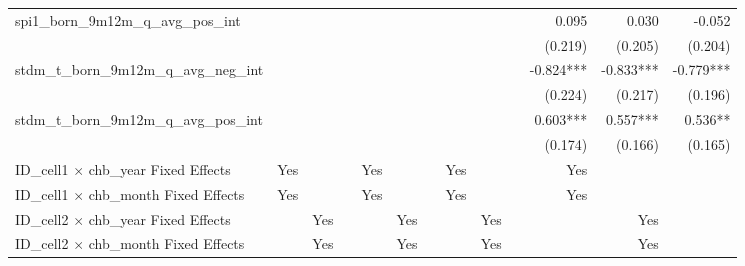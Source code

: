 \begin{tabular}{lrrrrrrrrrrrr}
spi1\_born\_9m12m\_q\_avg\_pos\_int         &              &              &              &              &              &              &              &              &              &        0.095 &        0.030 &       -0.052 \\ 
                                            &              &              &              &              &              &              &              &              &              &      (0.219) &      (0.205) &      (0.204) \\ 
stdm\_t\_born\_9m12m\_q\_avg\_neg\_int      &              &              &              &              &              &              &              &              &              &    -0.824*** &    -0.833*** &    -0.779*** \\ 
                                            &              &              &              &              &              &              &              &              &              &      (0.224) &      (0.217) &      (0.196) \\ 
stdm\_t\_born\_9m12m\_q\_avg\_pos\_int      &              &              &              &              &              &              &              &              &              &     0.603*** &     0.557*** &      0.536** \\ 
                                            &              &              &              &              &              &              &              &              &              &      (0.174) &      (0.166) &      (0.165) \\ 
\midrule
ID\_cell1 $\times$ chb\_year Fixed Effects  &          Yes &              &              &          Yes &              &              &          Yes &              &              &          Yes &              &              \\ 
ID\_cell1 $\times$ chb\_month Fixed Effects &          Yes &              &              &          Yes &              &              &          Yes &              &              &          Yes &              &              \\ 
ID\_cell2 $\times$ chb\_year Fixed Effects  &              &          Yes &              &              &          Yes &              &              &          Yes &              &              &          Yes &              \\ 
ID\_cell2 $\times$ chb\_month Fixed Effects &              &          Yes &              &              &          Yes &              &              &          Yes &              &              &          Yes &              \\ 

\end{tabular}
